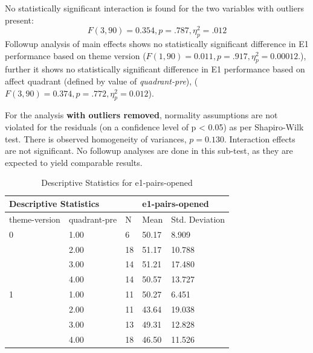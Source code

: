 		No statistically significant interaction is found for the two variables with outliers present: 
		\[ F(3, 90) = 0.354, p = .787, \eta_{p}^{2} = .012 \]
		Followup analysis of main effects shows no statistically significant difference in E1 performance based on theme version ($ F(1, 90) = 0.011, p = .917, \eta_{p}^{2} = 0.00012. $), further it shows no statistically significant difference in E1 performance based on affect quadrant (defined by value of \textit{quadrant-pre}), ($ F(3, 90) = 0.374, p = .772, \eta_{p}^{2} = 0.012 $).
		
		
		For the analysis \textbf{with outliers removed}, normality assumptions are not violated for the residuals (on a confidence level of p < 0.05) as per Shapiro-Wilk test. There is observed homogeneity of variances, $ p = 0.130 $. Interaction effects are not significant. No followup analyses are done in this sub-test, as they are expected to yield comparable results.

		\begin{table}[]
			\centering
			\begin{tabular}{ll|l|ll}
				\hline
				\multicolumn{2}{l}{Descriptive Statistics}   &    & \multicolumn{2}{l}{e1-pairs-opened} \\ \hline
				theme-version          & quadrant-pre & N  & Mean          & Std. Deviation        \\ \hline
				0                      & 1.00         & 6  & 50.17         & 8.909                 \\
				& 2.00         & 18 & 51.17         & 10.788                \\ 
				& 3.00         & 14 & 51.21         & 17.480                \\ 
				& 4.00         & 14 & 50.57         & 13.727                \\ \hline
				1                      & 1.00         & 11 & 50.27         & 6.451                 \\
				& 2.00         & 11 & 43.64         & 19.038                \\ 
				& 3.00         & 13 & 49.31         & 12.828                \\ 
				& 4.00         & 18 & 46.50         & 11.526                \\ \hline
			\end{tabular}
			\caption{Descriptive Statistics for e1-pairs-opened}
			\label{tbl:group-sized-quadrant-theme-version}
		\end{table}
		
